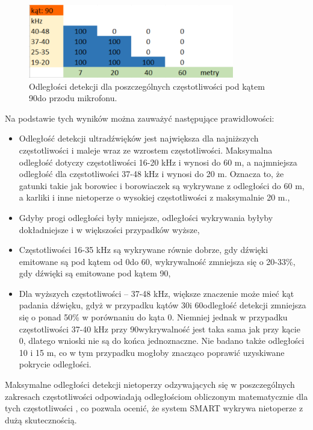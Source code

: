 \documentclass{sprz}
\begin{document}
  \begin{figure}[h]
    \centering
    \includegraphics[width=0.8\textwidth]{sprz/angle90.png}
    \caption{Odległości detekcji dla poszczególnych częstotliwości pod kątem 90\textdegree do przodu mikrofonu.}
    \label{img:angle90}
  \end{figure}

\newpage
Na podstawie tych wyników można zauważyć następujące prawidłowości:
\begin{itemize}
  \item{Odległość detekcji ultradźwięków jest największa dla najniższych częstotliwości i maleje wraz ze wzrostem częstotliwości. Maksymalna odległość dotyczy częstotliwości 16-20 kHz i wynosi do 60 m, a najmniejsza odległość dla częstotliwości 37-48 kHz i wynosi do 20 m. Oznacza to, że gatunki takie jak borowiec i borowiaczek są wykrywane z odległości do 60 m, a karliki i inne nietoperze o wysokiej częstotliwości z maksymalnie 20 m.,}
  \item{Gdyby progi odległości były mniejsze, odległości wykrywania byłyby dokładniejsze i w większości przypadków wyższe,}
  \item{Częstotliwości 16-35 kHz są wykrywane równie dobrze, gdy dźwięki emitowane są pod kątem od 0\textdegree do 60\textdegree, wykrywalność zmniejsza się o 20-33\%, gdy dźwięki są emitowane pod kątem 90\textdegree,}
  \item{Dla wyższych częstotliwości – 37-48 kHz, większe znaczenie może mieć kąt padania dźwięku, gdyż w przypadku kątów 30\textdegree i 60\textdegree odległość detekcji zmniejsza się o ponad 50\% w porównaniu do kąta 0\textdegree. Niemniej jednak w przypadku częstotliwości 37-40 kHz przy 90\textdegree wykrywalność jest taka sama jak przy kącie 0\textdegree, dlatego wnioski nie są do końca jednoznaczne. Nie badano także odległości 10 i 15 m, co w tym przypadku mogłoby znacząco poprawić uzyskiwane pokrycie odległości.}
\end{itemize}

Maksymalne odległości detekcji nietoperzy odzywających się w poszczególnych zakresach częstotliwości odpowiadają odległościom obliczonym matematycznie dla tych częstotliwości \cite{agranat}, co pozwala ocenić, że system SMART wykrywa nietoperze z dużą skutecznością.
\end{document}
